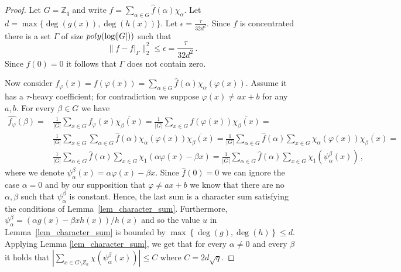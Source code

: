 \documentclass[11pt]{article}
\theoremstyle{definition}
\newcommand{\Z}{\mathbb{Z}}
\begin{document}
\begin{proof}
    Let $G = \Z_q$ and write $f  = \sum_{\alpha \in G} \widehat{f}(\alpha) \chi_\alpha$.
    Let $d = \max\{ \deg(g(x)), \deg(h(x)) \}$.
    Let $\epsilon = \frac{\tau}{32 d^2}$. Since $f$ is concentrated there is a set $\Gamma$ of size $poly(\log(\abs{G}))$  such that
    \[
        \| f - f|_\Gamma \|_{2}^{2} \leq \epsilon = \frac{\tau}{32 d^2} \,.
    \]
    Since $\widehat{f}(0) = 0$ it follows that $\Gamma$ does not contain zero.

    Now consider $f_\varphi(x) = f(\varphi(x)) = \sum_{\alpha \in G} \widehat{f}(\alpha) \chi_\alpha(\varphi(x))$.  Assume it has a $\tau$-heavy coefficient; for contradiction we suppose $\varphi(x) \ne ax + b$ for any $a, b$. For every $\beta \in G$ we have
    \begin{equation*}
        \begin{split}
            \widehat{f_\varphi}(\beta) = & \frac{1}{|G|} \sum_{x \in G} f_\varphi(x) \overline{\chi_\beta(x)} = \frac{1}{|G|} \sum_{x \in G} f(\varphi(x)) \overline{\chi_\beta(x)} = \\
            & \frac{1}{|G|} \sum_{x \in G} \sum_{\alpha \in G} \widehat{f}(\alpha) \chi_\alpha(\varphi(x)) \overline{\chi_\beta(x)} = \frac{1}{|G|} \sum_{\alpha \in G} \widehat{f}(\alpha) \sum_{x \in G} \chi_\alpha(\varphi(x)) \overline{\chi_\beta(x)} = \\
            & \frac{1}{|G|} \sum_{\alpha \in G} \widehat{f}(\alpha) \sum_{x \in G} \chi_1(\alpha \varphi(x) - \beta x) = \frac{1}{|G|} \sum_{\alpha \in G} \widehat{f}(\alpha) \sum_{x \in G} \chi_1(\psi^\beta_\alpha(x)) \, ,
        \end{split}
    \end{equation*}
    where we denote $\psi^\beta_\alpha(x) = \alpha \varphi(x) - \beta x$.
    Since $\widehat{f}(0) = 0$ we can ignore the case $\alpha = 0$ and by our supposition that $\varphi \ne ax+b$ we know that there are no $\alpha, \beta$ such that $\psi^\beta_\alpha$ is constant.
    Hence, the last sum is a character sum satisfying the conditions of Lemma~\ref{lem_character_sum}.
    Furthermore, $\psi^\beta_\alpha = (\alpha g(x) - \beta x h(x))/h(x)$ and so the value $u$ in Lemma~\ref{lem_character_sum} is bounded by $\max\left\{\deg(g), \deg(h)\right\} \leq d$.
    Applying Lemma \ref{lem_character_sum}, we get that for every $\alpha \ne 0$ and every $\beta$ it holds that $|\sum_{x \in G \setminus Z_h} \chi(\psi^\beta_\alpha(x))| \leq C$ where $C = 2 d \sqrt{q}$.


\end{proof}
\end{document}
